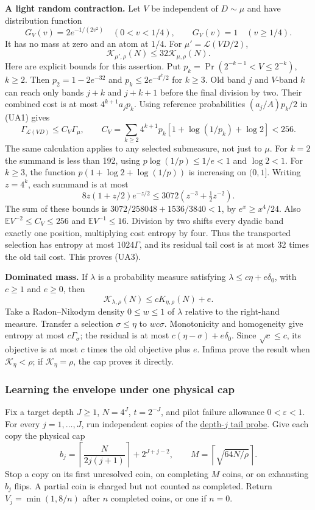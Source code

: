 \textbf{A light random contraction.} Let $V$ be independent of $D\sim\mu$ and have
distribution function
\[
 G_V(v)=2e^{-1/(2v^2)}\quad(0<v<1/4),\qquad
 G_V(v)=1\quad(v\ge1/4).
\]
It has no mass at zero and an atom at $1/4$. For $\mu'=\mathcal L(VD/2)$,
\[
 \mathcal K_{\mu',\rho}(N)\le32\mathcal K_{\mu,\rho}(N).                 \tag{UA3}
\]
Here are explicit bounds for this assertion. Put
$p_k=\Pr(2^{-k-1}<V\le2^{-k})$, $k\ge2$. Then
$p_2=1-2e^{-32}$ and $p_k\le2e^{-4^k/2}$ for $k\ge3$. Old band $j$ and
$V$-band $k$ can reach only bands $j+k$ and $j+k+1$ before the final
division by two. Their combined cost is at most $4^{k+1}a_jp_k$.
Using reference probabilities $(a_j/A)p_k/2$ in (UA1) gives
\[
 \Gamma_{\mathcal L(VD)}\le C_V\Gamma_\mu,
 \qquad C_V=\sum_{k\ge2}4^{k+1}p_k[1+\log(1/p_k)+\log2]<256. \tag{UA4}
\]
The same calculation applies to any selected submeasure, not just to $\mu$.
For $k=2$ the summand is less than 192, using
$p\log(1/p)\le1/e<1$ and $\log2<1$. For $k\ge3$, the function
$p(1+\log2+\log(1/p))$ is increasing on $(0,1]$. Writing $z=4^k$, each
summand is at most
\[
 8z(1+z/2)e^{-z/2}
 \le3072(z^{-3}+\tfrac12z^{-2}).
\]
The sum of these bounds is
$3072/258048+1536/3840<1$, by $e^x\ge x^4/24$.
Also $\mathbb EV^{-2}\le C_V\le256$ and
$\mathbb EV^{-1}\le16$. Division by two shifts every dyadic band exactly
one position, multiplying cost entropy by four. Thus the transported
selection has entropy at most $1024\Gamma$, and its residual tail cost is
at most 32 times the old tail cost. This proves (UA3).

\textbf{Dominated mass.} If $\lambda$ is a probability measure satisfying
$\lambda\le c\eta+e\delta_0$, with $c\ge1$ and $e\ge0$, then
\[
 \mathcal K_{\lambda,\rho}(N)\le cK_{\eta,\rho}(N)+e.             \tag{UA5}
\]
Take a Radon--Nikodym density $0\le w\le1$ of $\lambda$ relative to the
right-hand measure. Transfer a selection $\sigma\le\eta$ to $wc\sigma$.
Monotonicity and homogeneity give entropy at most $c\Gamma_\sigma$;
the residual is at most $c(\eta-\sigma)+e\delta_0$. Since $\sqrt c\le c$,
its objective is at most $c$ times the old objective plus $e$. Infima prove
the result when $\mathcal K_\eta<\rho$; if $\mathcal K_\eta=\rho$, the cap proves it directly.

\subsubsection{Learning the envelope under one physical cap}

Fix a target depth $J\ge1$, $N=4^J$, $t=2^{-J}$, and pilot failure allowance
$0<\varepsilon<1$. For every $j=1,\ldots,J$, run independent copies of the
\href{https://github.com/davidiach/adaptive-threshold-estimation/blob/9dbddf6622c17f37fb98c79bcf4407f579318a45/docs/ARBITRARY_LAW_TAIL.md}{depth-$j$ tail probe}. Give each copy the physical cap
\[
 b_j=\left\lceil\frac{N}{2j(j+1)}\right\rceil+2^{J+j-2},
 \qquad M=\left\lceil\sqrt{64N/\rho}\right\rceil.         \tag{UA6}
\]
Stop a copy on its first unresolved coin, on completing $M$ coins, or on
exhausting $b_j$ flips. A partial coin is charged but not counted as completed.
Return $V_j=\min(1,8/n)$ after $n$ completed coins, or one if $n=0$.

